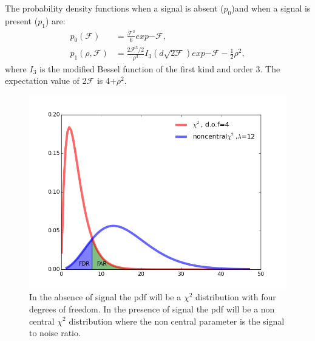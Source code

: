 \documentclass{ttuthes2007}
\begin{document}
The probability density functions when a signal is absent ($p_0$)and when a signal is
present ($p_1$) are:
\begin{equation}
\begin{split}
p_0(\mathcal{F})&=\frac{\mathcal{F}^3}{6}exp{-\mathcal{F}},\\
p_1(\rho,\mathcal{F})&=\frac{2\mathcal{F}^3/2}{\rho^3}I_3(d\sqrt{2\mathcal{F}})exp{-\mathcal{F}-\frac{1}{2}\rho^2},
\end{split}
\end{equation}
where $I_3$ is the modified Bessel function of the first kind and order 3.
The expectation value of 2$\mathcal{F}$ is 4+$\rho^2$.
\begin{figure}[h!]
	\includegraphics[width=\textwidth]{figure/chi2.png}
	\caption{In the absence of signal the pdf will be a $\chi^2$ distribution with
four degrees of freedom. In the presence of signal the pdf will be a non central
$\chi^2$ distribution where the non central parameter is the signal to noise
ratio.}
\end{figure}
\end{document}
